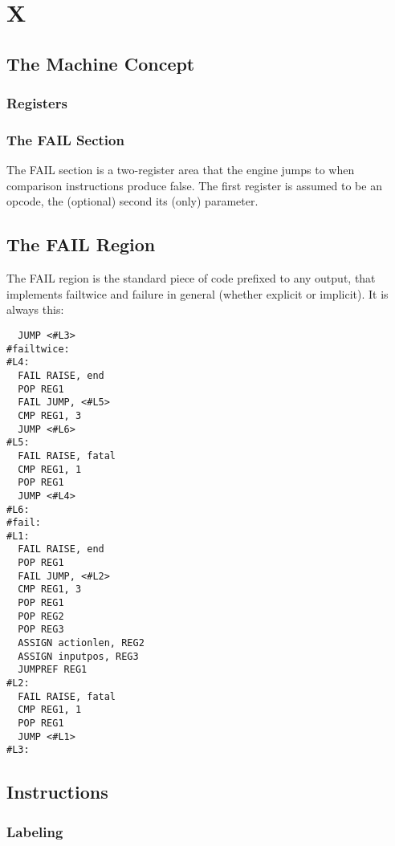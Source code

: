 \section{X}

\subsection{The Machine Concept}

\subsubsection{Registers}

\subsubsection{The FAIL Section}

The FAIL section is a two-register area that the engine jumps to
when comparison instructions produce false. The first register is
assumed to be an opcode, the (optional) second its (only) parameter.

\subsection{The FAIL Region}

The FAIL region is the standard piece of code prefixed to any output,
that implements failtwice and failure in general (whether explicit or
implicit). It is always this:

\begin{verbatim}
  JUMP <#L3>
#failtwice:
#L4:
  FAIL RAISE, end
  POP REG1
  FAIL JUMP, <#L5>
  CMP REG1, 3
  JUMP <#L6>
#L5:
  FAIL RAISE, fatal
  CMP REG1, 1
  POP REG1
  JUMP <#L4>
#L6:
#fail:
#L1:
  FAIL RAISE, end
  POP REG1
  FAIL JUMP, <#L2>
  CMP REG1, 3
  POP REG1
  POP REG2
  POP REG3
  ASSIGN actionlen, REG2
  ASSIGN inputpos, REG3
  JUMPREF REG1
#L2:
  FAIL RAISE, fatal
  CMP REG1, 1
  POP REG1
  JUMP <#L1>
#L3:

\end{verbatim}

\subsection{Instructions}

\subsubsection{Labeling}

